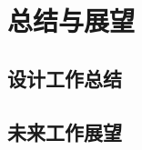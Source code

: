 
\chapter{总结与展望}\label{chap:7}

\templateblank

\section{设计工作总结}

\templateblank

\section{未来工作展望}

\templateblank
